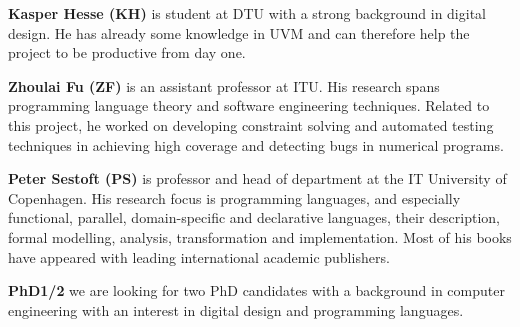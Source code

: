 \documentclass[fleqn,12pt]{article}
\begin{document}
{\bf Kasper Hesse (KH)} is student at DTU with a strong background in digital design.
He has already some knowledge in UVM and can therefore help the project to be productive
from day one.

{\bf Zhoulai Fu (ZF)} is an assistant professor at ITU. His research
spans programming language theory and software engineering
techniques. Related to this project, he worked on developing
constraint solving and automated testing techniques in achieving high
coverage and detecting bugs in numerical programs.

{\bf Peter Sestoft (PS)} is professor and head of department at the IT University of Copenhagen.
His research focus is programming languages, and especially functional, parallel, domain-specific
and declarative languages, their description, formal modelling, analysis, transformation and implementation.
Most of his books have appeared with leading international academic publishers.

{\bf PhD1/2} we are looking for two PhD candidates with a background in computer engineering
with an interest in digital design and programming languages.

%
\end{document}
